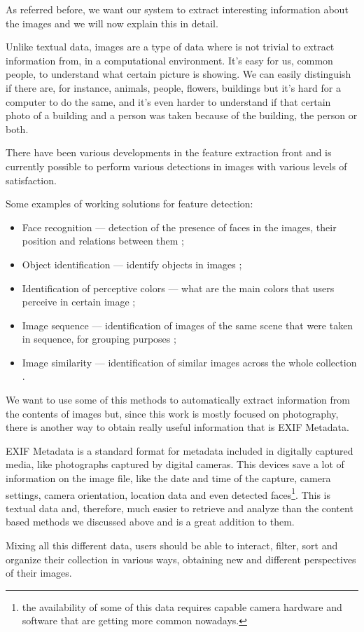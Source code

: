 
As referred before, we want our system to extract interesting information about the images and we will now explain this in detail.


Unlike textual data, images are a type of data where is not trivial to extract information from, in a computational environment. It's easy for us, common people, to understand what certain picture is showing. We can easily distinguish if there are, for instance, animals, people, flowers, buildings but it's hard for a computer to do the same, and it's even harder to understand if that certain photo of a building and a person was taken because of the building, the person or both.

There have been various developments in the feature extraction front \cite{Liu:2007p3740,Datta:2005p3749,Rui:1999p949} and is currently possible to perform various detections in images with various levels of satisfaction.

Some examples of working solutions for feature detection:

\begin{itemize}
	\item{Face recognition — detection of the presence of faces in the images, their position and relations between them \cite{Vasconcelos:2005in,Chen:2003p3699,Tamura:2002p859,Hsu:2002p3675};}
	\item{Object identification — identify objects in images \cite{Torralba:2008p527};}
	\item{Identification of perceptive colors —  what are the main colors that users perceive in certain image \cite{Sural:2002bt,Tan:2001p850};}
	\item{Image sequence  —  identification of images of the same scene that were taken in sequence, for grouping purposes \cite{Cooper:2003p3679};}
	\item{Image similarity  —  identification of similar images across the whole collection \cite{Vasconcelos:2005in,Zaheer:2010p3735,Worring:2008p2876}.}
\end{itemize}

We want to use some of this methods to automatically extract information from the contents of images but, since this work is mostly focused on photography, there is another way to obtain really useful information that is EXIF Metadata.

EXIF Metadata is a standard format for metadata included in digitally captured media, like photographs captured by digital cameras. This devices save a lot of information on the image file, like the date and time of the capture, camera settings, camera orientation, location data and even detected faces\footnote{the availability of some of this data requires capable camera hardware and software that are getting more common nowadays.}. This is textual data and, therefore, much easier to retrieve and analyze than the content based methods we discussed above and is a great addition to them.

Mixing all this different data, users should be able to interact, filter, sort and organize their collection in various ways, obtaining new and different perspectives of their images.



